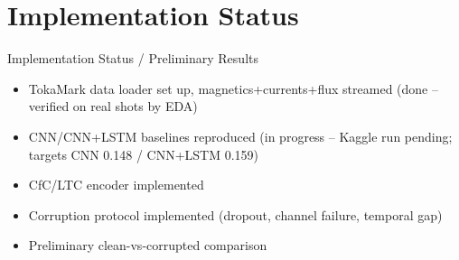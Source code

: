 \documentclass[aspectratio=169]{beamer}
\begin{document}
\section{Implementation Status}
\begin{frame}{Implementation Status / Preliminary Results}
  
  \vspace{4pt}
  \begin{itemize}
    \item[$\boxtimes$] TokaMark data loader set up, magnetics+currents+flux streamed (done -- verified on real shots by EDA)
    \item[$\square$] CNN/CNN+LSTM baselines reproduced (in progress -- Kaggle run pending; targets CNN 0.148 / CNN+LSTM 0.159)
    \item[$\square$] CfC/LTC encoder implemented
    \item[$\square$] Corruption protocol implemented (dropout, channel failure, temporal gap)
    \item[$\square$] Preliminary clean-vs-corrupted comparison
  \end{itemize}
  \vspace{8pt}
  \begin{center}
  \end{center}
\end{frame}

\end{document}
